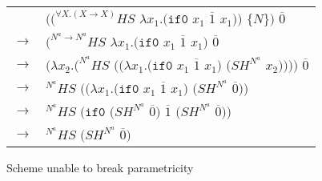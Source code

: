 \begin{figure}
\centering
\begin{tabular}{ll}
\vspace{5pt}

& $((^{\forall X.(X\rightarrow X)}HS$ $\lambda x_{1}.(\mathtt{if0}$ $x_{1}$ $\overline{1}$ $x_{1}))$ $\lbrace N\rbrace)$ $\overline{0}$ \\

\vspace{5pt}

$\rightarrow$ & $(^{N^{a}\rightarrow N^{a}}HS$ $\lambda x_{1}.(\mathtt{if0}$ $x_{1}$ $\overline{1}$ $x_{1})$ $\overline{0}$ \\

\vspace{5pt}

$\rightarrow$ & $(\lambda x_{2}.(^{N^{a}}HS$ $((\lambda x_{1}.(\mathtt{if0}$ $x_{1}$ $\overline{1}$ $x_{1})$ $(SH^{N^{a}}$ $x_{2}))))$ $\overline{0}$ \\

\vspace{5pt}

$\rightarrow$ & $^{N^{a}}HS$ $((\lambda x_{1}.(\mathtt{if0}$ $x_{1}$ $\overline{1}$ $x_{1})$ $(SH^{N^{a}}$ $\overline{0}))$ \\

\vspace{5pt}

$\rightarrow$ & $^{N^{a}}HS$ $(\mathtt{if0}$ $(SH^{N^{a}}$ $\overline{0})$ $\overline{1}$ $(SH^{N^{a}}$ $\overline{0}))$ \\

\vspace{5pt}

$\rightarrow$ & ${^{N^{a}}H}S$ $(SH^{N^{a}}$ $\overline{0})$
\end{tabular}
\caption{Scheme unable to break parametricity}
\label{forall-1}
\end{figure}